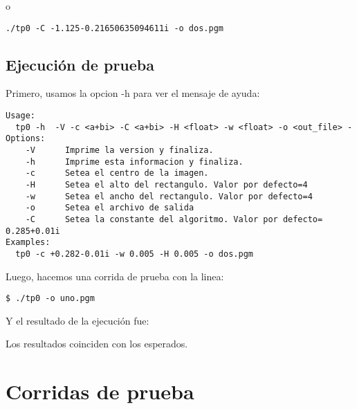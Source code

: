 \bigskip
o

\bigskip
\texttt{./tp0 -C -1.125-0.21650635094611i -o dos.pgm}

	
\subsection{Ejecución de prueba}
     Primero, usamos la opcion -h para ver el mensaje de ayuda:
     \begin{verbatim}
Usage:
  tp0 -h  -V -c <a+bi> -C <a+bi> -H <float> -w <float> -o <out_file> -
Options:
    -V	    Imprime la version y finaliza.
    -h	    Imprime esta informacion y finaliza.
    -c	    Setea el centro de la imagen.
    -H	    Setea el alto del rectangulo. Valor por defecto=4
    -w	    Setea el ancho del rectangulo. Valor por defecto=4
    -o	    Setea el archivo de salida
    -C	    Setea la constante del algoritmo. Valor por defecto= 0.285+0.01i
Examples:
  tp0 -c +0.282-0.01i -w 0.005 -H 0.005 -o dos.pgm
 	     \end{verbatim}
	     
Luego, hacemos una corrida de prueba con la linea:

\bigskip
\texttt{\$  ./tp0 -o uno.pgm}

\bigskip
Y el resultado de la ejecución fue:

\bigskip

\bigskip
Los resultados coinciden con los esperados.

\section{Corridas de prueba}

